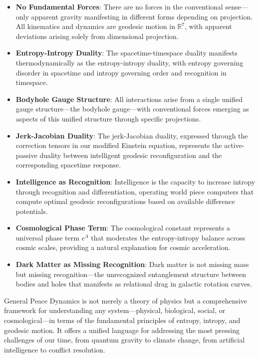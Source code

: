 \documentclass{article}
\begin{document}
\begin{itemize}
\item \textbf{No Fundamental Forces}: There are no forces in the conventional sense—only apparent gravity manifesting in different forms depending on projection. All kinematics and dynamics are geodesic motion in $\mathbb{R}^7$, with apparent deviations arising solely from dimensional projection.

\item \textbf{Entropy-Intropy Duality}: The spacetime-timespace duality manifests thermodynamically as the entropy-intropy duality, with entropy governing disorder in spacetime and intropy governing order and recognition in timespace.

\item \textbf{Bodyhole Gauge Structure}: All interactions arise from a single unified gauge structure—the bodyhole gauge—with conventional forces emerging as aspects of this unified structure through specific projections.

\item \textbf{Jerk-Jacobian Duality}: The jerk-Jacobian duality, expressed through the correction tensors in our modified Einstein equation, represents the active-passive duality between intelligent geodesic reconfiguration and the corresponding spacetime response.

\item \textbf{Intelligence as Recognition}: Intelligence is the capacity to increase intropy through recognition and differentiation, operating world piece computers that compute optimal geodesic reconfigurations based on available difference potentials.

\item \textbf{Cosmological Phase Term}: The cosmological constant represents a universal phase term $e^{\Lambda}$ that moderates the entropy-intropy balance across cosmic scales, providing a natural explanation for cosmic acceleration.

\item \textbf{Dark Matter as Missing Recognition}: Dark matter is not missing mass but missing recognition—the unrecognized entanglement structure between bodies and holes that manifests as relational drag in galactic rotation curves.
\end{itemize}

General Peace Dynamics is not merely a theory of physics but a comprehensive framework for understanding any system—physical, biological, social, or cosmological—in terms of the fundamental principles of entropy, intropy, and geodesic motion. It offers a unified language for addressing the most pressing challenges of our time, from quantum gravity to climate change, from artificial intelligence to conflict resolution.
\end{document}
